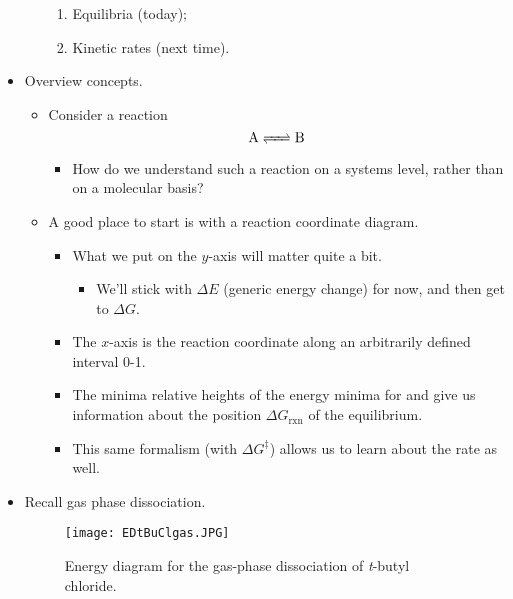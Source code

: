 \documentclass[../notes.tex]{subfiles}
\begin{document}
\begin{itemize}
\begin{itemize}
        \begin{enumerate}[label={\arabic*)}]
            \item Equilibria (today);
            \item Kinetic rates (next time).
        \end{enumerate}
    \end{itemize}
    \item Overview concepts.
    \begin{itemize}
        \item Consider a reaction
        \begin{equation*}
            \ce{A <=> B}
        \end{equation*}
        \begin{itemize}
            \item How do we understand such a reaction on a systems level, rather than on a molecular basis?
        \end{itemize}
        \item A good place to start is with a reaction coordinate diagram.
        \begin{itemize}
            \item What we put on the $y$-axis will matter quite a bit.
            \begin{itemize}
                \item We'll stick with $\Delta E$ (generic energy change) for now, and then get to $\Delta G$.
            \end{itemize}
            \item The $x$-axis is the reaction coordinate along an arbitrarily defined interval 0-1.
            \item The minima relative heights of the energy minima for  and  give us information about the position $\Delta G_\text{rxn}$ of the equilibrium.
            \item This same formalism (with $\Delta G^\ddagger$) allows us to learn about the rate as well.
        \end{itemize}
    \end{itemize}
    \item Recall gas phase dissociation.
    \begin{figure}[H]
        \centering
        \texttt{[image: EDtBuClgas.JPG]}
        \caption{Energy diagram for the gas-phase dissociation of \emph{t}-butyl chloride.}
        \label{fig:EDtBuClgas}
    \end{figure}

\end{itemize}
\end{document}
